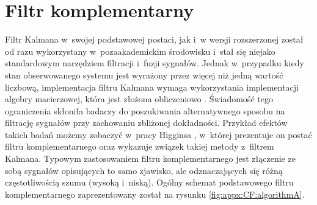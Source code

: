 \section*{Filtr komplementarny}\label{sec:appx:filters:CF}
Filtr Kalmana w~swojej podstawowej postaci, jak i~w wersji rozszerzonej został od razu wykorzystany w~pozaakademickim środowisku i~stał się niejako standardowym narzędziem filtracji i~fuzji sygnałów. Jednak w~przypadku kiedy stan obserwowanego systemu jest wyrażony przez więcej niż jedną wartość liczbową, implementacja filtru Kalmana wymaga wykorzystania implementacji algebry macierzowej, która jest złożona obliczeniowo \cite{wiki:MatrixAlgebraComplexity2016}. Świadomość tego ograniczenia skłoniła badaczy do poszukiwania alternatywnego sposobu na filtrację sygnałów przy zachowaniu zbliżonej dokładności. Przykład efektów takich badań możemy zobaczyć w~pracy Higginsa \cite{Higgins1975}, w~której prezentuje on postać filtru komplementarnego oraz wykazuje związek takiej metody z~filtrem Kalmana. Typowym zastosowaniem filtru komplementarnego jest złączenie ze sobą sygnałów opisujących to samo zjawisko, ale odznaczających się różną częstotliwością szumu (wysoką i~niską). Ogólny schemat podstawowego filtru komplementarnego zaprezentowany został na rysunku \ref{fig:appx:CF:algorithmA}.

\newcommand{\suma}{\Large$+$}
\newcommand{\inte}{$\displaystyle \int$}
\newcommand{\derv}{\huge$\frac{d}{dt}$}


